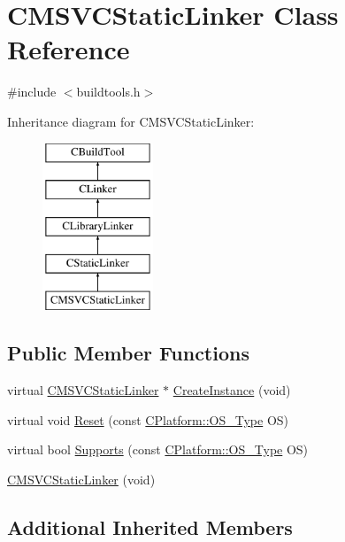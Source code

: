\hypertarget{classCMSVCStaticLinker}{\section{C\-M\-S\-V\-C\-Static\-Linker Class Reference}
\label{classCMSVCStaticLinker}
}


{\ttfamily \#include $<$buildtools.\-h$>$}

Inheritance diagram for C\-M\-S\-V\-C\-Static\-Linker\-:\begin{figure}[H]
\begin{center}
\leavevmode
\includegraphics[height=5.000000cm]{db/d6e/classCMSVCStaticLinker}
\end{center}
\end{figure}
\subsection*{Public Member Functions}
\begin{DoxyCompactItemize}
\item 
virtual \hyperlink{classCMSVCStaticLinker}{C\-M\-S\-V\-C\-Static\-Linker} $\ast$ \hyperlink{classCMSVCStaticLinker_ab05784f22189ba02f8d2f4be2c3ab095}{Create\-Instance} (void)
\item 
virtual void \hyperlink{classCMSVCStaticLinker_ac7a93fa46130ad965232df605574a41c}{Reset} (const \hyperlink{classCPlatform_a2fb735c63c53052f79629e338bb0f535}{C\-Platform\-::\-O\-S\-\_\-\-Type} O\-S)
\item 
virtual bool \hyperlink{classCMSVCStaticLinker_a3328e630b5bd54ab6b32f8a900908ccf}{Supports} (const \hyperlink{classCPlatform_a2fb735c63c53052f79629e338bb0f535}{C\-Platform\-::\-O\-S\-\_\-\-Type} O\-S)
\item 
\hyperlink{classCMSVCStaticLinker_a8177e976027b9f9de073e31431fa8016}{C\-M\-S\-V\-C\-Static\-Linker} (void)
\end{DoxyCompactItemize}
\subsection*{Additional Inherited Members}


